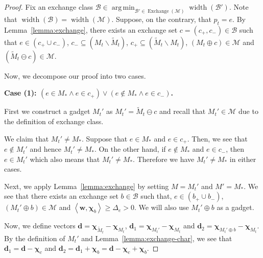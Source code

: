 \documentclass{article}
\newcommand{\M}{\mathcal M}
\newcommand{\B}{\mathcal B}
\newcommand{\del}{\backslash}
\DeclareMathOperator{\rank}{width}
\DeclareMathOperator*{\argmin}{arg\,min}
\DeclareMathOperator{\Exchange}{Exchange}
\newcommand{\inn}[1]{\left\langle #1 \right\rangle}
\renewcommand{\vec}[1]{\boldsymbol{#1}}
\begin{document}
\begin{proof}
Fix an exchange class $\B\in \argmin_{\B'\in \Exchange(\M)} \rank(\B')$.
Note that $\rank(\B) = \rank(\M)$.
Suppose, on the contrary, that $p_t = e$.
By Lemma~\ref{lemma:exchange}, there exists an exchange set $c=(c_+,c_-) \in \B$
such that $e\in (c_+\cup c_-)$, $c_- \subseteq (M_t \del \tilde M_t)$, $c_+ \subseteq (\tilde M_t \del M_t)$, $(M_t\oplus c) \in \M$ and $(\tilde M_t \ominus c) \in \M$.


Now, we decompose our proof into two cases.

\textbf{Case (1): $(e \in M_* \wedge e\in c_+) \vee (e \not \in M_* \wedge e\in c_-)$.}

First we construct a gadget $M_t'$ as $M_t' = \tilde M_t \ominus c$ and recall that $M_t' \in \M$ due to the definition of exchange class.

We claim that $M_t'\not= M_*$.
Suppose that $e\in M_*$ and $e\in c_+$.
Then, we see that $e\not\in M_t'$ and hence $M_t'\not=M_*$.
On the other hand, if $e\not \in M_*$ and $e\in c_-$, then $e\in M_t'$ which also means that $M_t'\not= M_*$.
Therefore we have $M_t'\not=M_*$ in either cases.


Next, we apply Lemma~\ref{lemma:exchange} by setting $M=M_t'$ and $M'=M_*$.
We see that there exists an exchange set $b\in \B$ such that, $e\in (b_+\cup b_-)$, $(M_t' \oplus b) \in \M$ and
 $\inn{\vec w, \vec \chi_b} \ge \Delta_e > 0$.
We will also use $M_t'\oplus b$ as a gadget.

Now, we define vectors $\vec d = \vec \chi_{\tilde M_t} - \vec \chi_{M_t}$, $\vec d_1 = \vec\chi_{M_t'}-\vec\chi_{M_t}$ and $\vec d_2 = \vec\chi_{M_t'\oplus b}-\vec\chi_{M_t}$.
By the definition of $M_t'$ and Lemma~\ref{lemma:exchange-char}, we see that $\vec d_1 = \vec d - \vec \chi_{c}$ and $\vec d_2 = \vec d_1+\vec \chi_b = \vec d-\vec \chi_c+\vec \chi_b$.



\end{proof}
\end{document}
